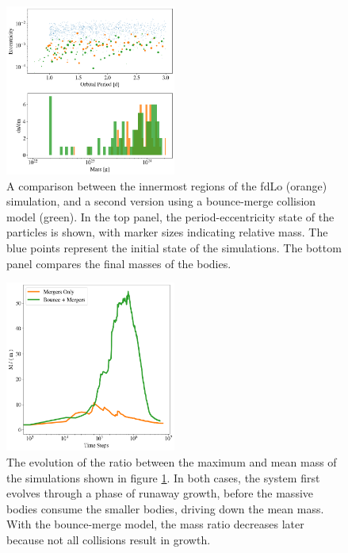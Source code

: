 \documentclass[twocolumn]{aastex63}
\begin{document}
\begin{figure}
\begin{center}
    \includegraphics[width=0.5\textwidth]{figures/frag_ecc.png}
    \caption{A comparison between the innermost regions of the fdLo (orange) simulation, and a second version using a bounce-merge collision model (green). In the top panel, the period-eccentricity state of the particles is shown, with marker sizes indicating relative mass. The blue points represent the initial state of the simulations. The bottom panel compares the final masses of the bodies. \label{fig:frag_ecc}}
\end{center}
\end{figure}

\begin{figure}
\begin{center}
    \includegraphics[width=0.5\textwidth]{figures/frag_evo.png}
    \caption{The evolution of the ratio between the maximum and mean mass of the simulations shown in figure \ref{fig:frag_ecc}. In both cases, the system first evolves through a phase of runaway growth, before the massive bodies consume the smaller bodies, driving down the mean mass. With the bounce-merge model, the mass ratio decreases later because not all collisions result in growth.\label{fig:frag_evo}}
\end{center}
\end{figure}
\end{document}
